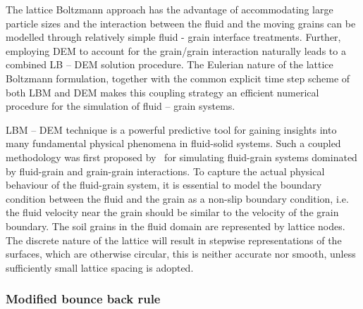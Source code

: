 The lattice Boltzmann approach has the advantage of accommodating large 
particle sizes and the interaction between the fluid and the moving grains 
can be modelled through relatively simple fluid - grain interface treatments. 
Further, employing DEM to account for the grain/grain interaction naturally 
leads to a combined LB -- DEM solution procedure. The Eulerian nature 
of the lattice Boltzmann formulation, together with the common explicit time 
step scheme of both LBM and DEM makes this coupling strategy an efficient 
numerical procedure for the simulation of fluid -- grain systems. 

LBM -- DEM technique is a powerful predictive tool for gaining insights into 
many fundamental physical phenomena in fluid-solid systems. 
Such a coupled methodology was first proposed by~\citep{Cook2004} for 
simulating fluid-grain systems dominated by fluid-grain and grain-grain 
interactions. To capture the actual physical behaviour of the fluid-grain 
system, it is essential to model the boundary condition between the fluid and 
the grain as a non-slip boundary condition, i.e. the fluid velocity near the 
grain should be similar to the velocity of the grain boundary. The soil grains 
in the fluid domain are represented by lattice nodes. The discrete nature of 
the lattice will result in stepwise representations of the surfaces, which are 
otherwise circular, this is  neither accurate nor smooth, unless sufficiently 
small lattice spacing is adopted. 


\subsubsection*{Modified bounce back rule}

